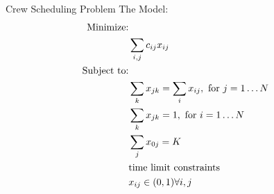 \documentclass{beamer}
\begin{document}
\begin{frame}{Crew Scheduling Problem}
The Model:
   \begin{subequations}
    \begin{align}
        \text{Minimize:}\notag \\
        &\sum_{i,j} c_{ij} x_{ij} \\
        \text{Subject to:} \\
        &\sum_{k} x_{jk} = \sum_{i} x_{ij}, \text{ for }j = 1 \ldots N \\
        &\sum_{k} x_{jk} = 1, \text{ for }i = 1 \ldots N   \\
        &\sum_{j} x_{0j} = K   \\
        &\text{time limit constraints} \\
        &x_{ij} \in (0, 1) \forall i, j
    \end{align}
   \end{subequations}
\end{frame}
\end{document}
